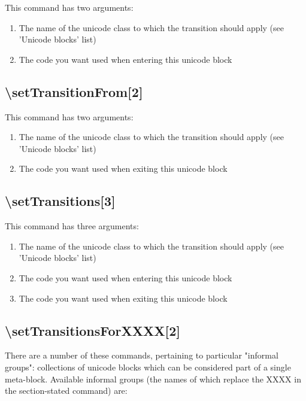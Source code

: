 \documentclass{article}
\newenvironment{numberlist}{%
  \begin{enumerate}
	\setlength{\itemsep}{0pt}
	\setlength{\parsep}{0pt}
	\setlength{\topsep}{0pt}
	\setlength{\partopsep}{0pt}
	\setlength{\parskip}{0pt}
	\setlength{\labelsep}{5pt}}%
{
  \end{enumerate}}
\begin{document}
			This command has two arguments:
			
			\begin{numberlist}
				\item The name of the unicode class to which the transition should apply (see 'Unicode blocks' list)
				\item The code you want used when entering this unicode block
			\end{numberlist}

		\subsection{\textbackslash setTransitionFrom[2]}

			This command has two arguments:
			
			\begin{numberlist}
				\item The name of the unicode class to which the transition should apply (see 'Unicode blocks' list)
				\item The code you want used when exiting this unicode block
			\end{numberlist}
		
		\subsection{\textbackslash setTransitions[3]}
		
			This command has three arguments:	
		
			\begin{numberlist}
				\item The name of the unicode class to which the transition should apply (see 'Unicode blocks' list)
				\item The code you want used when entering this unicode block
				\item The code you want used when exiting this unicode block
			\end{numberlist}

		\subsection{\textbackslash setTransitionsForXXXX[2]}

			There are a number of these commands, pertaining to particular "informal groups": collections of unicode blocks which can be considered part of a single meta-block. Available informal groups (the names of which replace the XXXX in the section-stated command) are:
			
\end{document}
